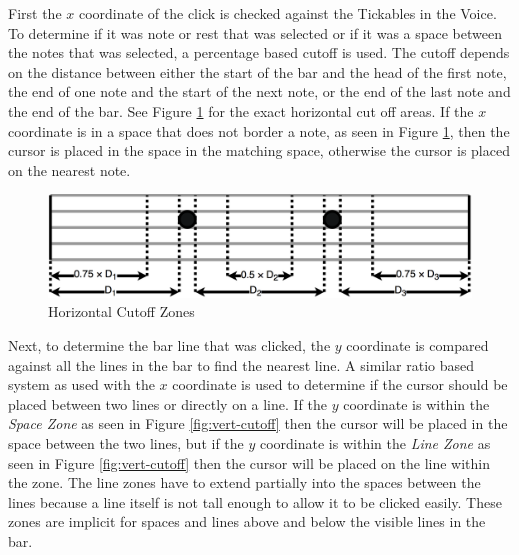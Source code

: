 \documentclass[letterpaper,12pt]{article}
\begin{document}
First the $ x $ coordinate of the click is checked against the Tickables in the Voice. To determine if it was note
or rest that was selected or if it was a space between the notes that was selected, a percentage based cutoff is used.
The cutoff depends on the distance between either the start of the bar and the head of the first note, the end of one
note and the start of the next note, or the end of the last note and the end of the bar. See Figure
\ref{fig:hori-cutoff} for the exact horizontal cut off areas. If the $ x $ coordinate is in a space that does not border
a note, as seen in Figure \ref{fig:hori-cutoff}, then the cursor is placed in the space in the matching space, otherwise
the cursor is placed on the nearest note.

\begin{figure}[H]
    \begin{center}
        \includegraphics[scale=0.2]{imgs/hori-cutoff.png}
    \end{center}
    \caption{Horizontal Cutoff Zones}
    \label{fig:hori-cutoff}
\end{figure}

Next, to determine the bar line that was clicked, the $ y $ coordinate is compared against all the lines in the bar to
find the nearest line. A similar ratio based system as used with the $ x $ coordinate is used to determine if the cursor
should be placed between two lines or directly on a line. If the $ y $ coordinate is within the \textit{Space Zone} as
seen in Figure \ref{fig:vert-cutoff} then the cursor will be placed in the space between the two lines, but if the $ y $
coordinate is within the \textit{Line Zone} as seen in Figure \ref{fig:vert-cutoff} then the cursor will be placed on
the line within the zone. The line zones have to extend partially into the spaces between the lines because a line
itself is not tall enough to allow it to be clicked easily. These zones are implicit for spaces and lines above and
below the visible lines in the bar.
\end{document}
